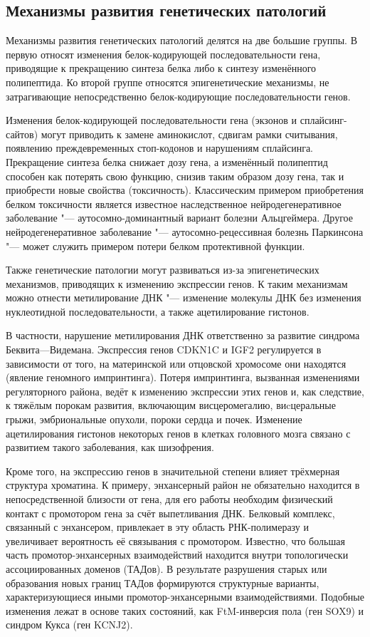 \documentclass[a4paper,12pt]{article}
\begin{document}
\subsection{Механизмы развития генетических патологий}

Механизмы развития генетических патологий делятся на две большие группы.
В первую относят изменения белок-кодирующей последовательности гена, приводящие к прекращению синтеза белка либо к синтезу изменённого полипептида.
Ко второй группе относятся эпигенетические механизмы, не затрагивающие непосредственно белок-кодирующие последовательности генов.

Изменения белок-кодирующей последовательности гена (экзонов и сплайсинг-сайтов) могут приводить к замене аминокислот, сдвигам рамки считывания, появлению преждевременных стоп-кодонов и нарушениям сплайсинга.
Прекращение синтеза белка снижает дозу гена, а изменённый полипептид способен как потерять свою функцию, снизив таким образом дозу гена, так и приобрести новые свойства (токсичность).
Классическим примером приобретения белком токсичности является известное наследственное нейродегенеративное заболевание "--- аутосомно-доминантный вариант болезни Альцгеймера.
Другое нейродегенеративное заболевание "--- аутосомно-рецессивная болезнь Паркинсона "--- может служить примером потери белком протективной функции\cite{Winklhofer_2008}.

Также генетические патологии могут развиваться из-за эпигенетических механизмов, приводящих к изменению экспрессии генов.
К таким механизмам можно отнести метилирование ДНК "--- изменение молекулы ДНК без изменения нуклеотидной последовательности, а также ацетилирование гистонов\cite{Handy_2011}.

В частности, нарушение метилирования ДНК ответственно за развитие синдрома Беквита---Видемана.
Экспрессия генов CDKN1C и IGF2 регулируется в зависимости от того, на материнской или отцовской хромосоме они находятся (явление геномного импринтинга).
Потеря импринтинга, вызванная изменениями регуляторного района, ведёт к изменению экспрессии этих генов и, как следствие, к тяжёлым порокам развития, включающим висцеромегалию, виcцеральные грыжи, эмбриональные опухоли, пороки сердца и почек\cite{Jin_2018}.
Изменение ацетилирования гистонов некоторых генов в клетках головного мозга связано с развитием такого заболевания, как шизофрения\cite{Tang_2011}.

Кроме того, на экспрессию генов в значительной степени влияет трёхмерная структура хроматина.
К примеру, энхансерный район не обязательно находится в непосредственной близости от гена, для его работы необходим физический контакт с промотором гена за счёт выпетливания ДНК.
Белковый комплекс, связанный с энхансером, привлекает в эту область РНК-полимеразу и увеличивает вероятность её связывания с промотором.
Известно, что большая часть промотор-энхансерных взаимодействий находится внутри топологически ассоциированных доменов (ТАДов)\cite{Rao_2014}.
В результате разрушения старых или образования новых границ ТАДов формируются структурные варианты, характеризующиеся иными промотор-энхансерными взаимодействиями.
Подобные изменения лежат в основе таких состояний, как FtM-инверсия пола (ген SOX9) и синдром Кукса (ген KCNJ2)\cite{Spielmann_2018}.
\end{document}
